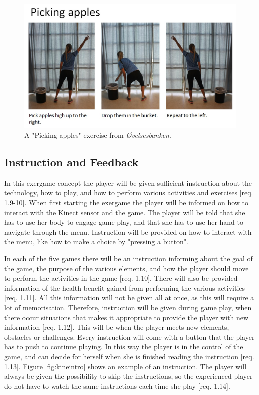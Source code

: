 \begin{figure} [H]
\centering
\includegraphics[scale=0.5]{PickingApplesAlone.jpg}
\caption[Exercise - picking apples]{A "Picking apples" exercise from \emph{Øvelsesbanken}.}
\label{pickingapples}
\end{figure}

\subsection{Instruction and Feedback}
In this exergame concept the player will be given sufficient instruction about the technology, how to play, and how to perform various activities and exercises [req. 1.9-10]. When first starting the exergame the player will be informed on how to interact with the Kinect sensor and the game. The player will be told that she has to use her body to engage game play, and that she has to use her hand to navigate through the menu. Instruction will be provided on how to interact with the menu, like how to make a choice by "pressing a button". 

In each of the five games there will be an instruction informing about the goal of the game, the purpose of the various elements, and how the player should move to perform the activities in the game [req. 1.10]. There will also be provided information of the health benefit gained from performing the various activities [req. 1.11]. All this information will not be given all at once, as this will require a lot of memorisation. Therefore, instruction will be given during game play, when there occur situations that makes it appropriate to provide the player with new information [req. 1.12]. This will be when the player meets new elements, obstacles or challenges. Every instruction will come with a button that the player has to push to continue playing. In this way the player is in the control of the game, and can decide for herself when she is finished reading the instruction [req. 1.13]. Figure \ref{fig:kineintro} shows an example of an instruction. The player will always be given the possibility to skip the instructions, so the experienced player do not have to watch the same instructions each time she play [req. 1.14].

